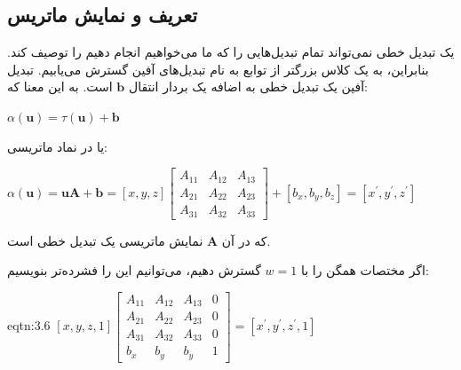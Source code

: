 \subsection{\textbf{تعریف و نمایش ماتریس}}
\label{subsec:3.2.2}
{
    \Large
    \begin{spacing}{1.5}
        یک تبدیل خطی نمی‌تواند تمام تبدیل‌هایی را که ما می‌خواهیم انجام دهیم را توصیف کند.
        بنابراین، به یک کلاس بزرگتر از توابع به نام تبدیل‌های آفین گسترش می‌یابیم.
        تبدیل آفین یک تبدیل خطی به اضافه یک بردار انتقال $\textbf{b}$ است. به این معنا که:

        \begin{center}
            $\alpha(\textbf{u})=\tau(\textbf{u})+\textbf{b}$
        \end{center}

        یا در نماد ماتریسی:

        \begin{center}
            $\alpha(\textbf{u})=\textbf{uA}+\textbf{b}=[x, y, z]\begin{bmatrix}
                                                                    A_{11} & A_{12} & A_{13} \\
                                                                    A_{21} & A_{22} & A_{23} \\
                                                                    A_{31} & A_{32} & A_{33}
            \end{bmatrix}+[b_{x},b_{y},b_{z}]=[x^\prime,y^\prime,z^\prime]$
        \end{center}

        که در آن $\textbf{A}$ نمایش ماتریسی یک تبدیل خطی است.

        اگر مختصات همگن را با $w=1$ گسترش دهیم، می‌توانیم این را فشرده‌تر بنویسیم:

        \begin{eqtn}{eqtn:3.6}
            \centering
            $[x, y, z, 1]\begin{bmatrix}
                             A_{11} & A_{12} & A_{13} & 0 \\
                             A_{21} & A_{22} & A_{23} & 0 \\
                             A_{31} & A_{32} & A_{33} & 0 \\
                             b_{x}  & b_{y}  & b_{y}  & 1
            \end{bmatrix}=[x^\prime, y^\prime, z^\prime,1]$
        \end{eqtn}


\end{spacing}}
